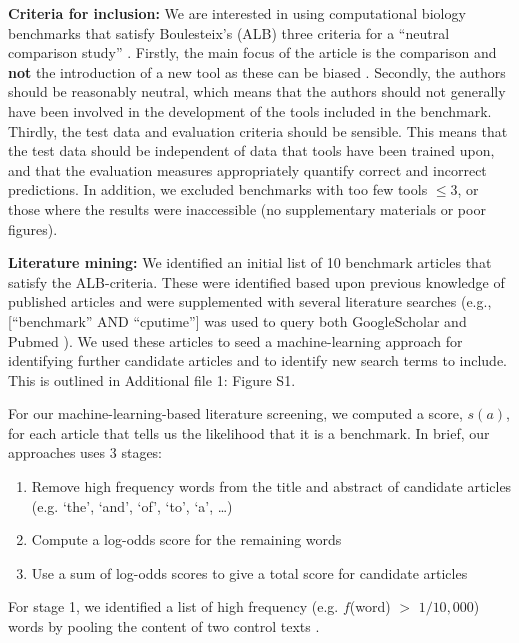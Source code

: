 \documentclass{bmcart}
\begin{document}
\textbf{Criteria for inclusion:} We are interested in using
computational biology benchmarks that satisfy Boulesteix’s (ALB) three
criteria for a ``neutral comparison study''
\cite{Boulesteix2013-vb}. Firstly, the main focus of the article is
the comparison and \textbf{not} the introduction of a new tool
{\color{black}as these can be biased} \cite{Buchka:2021a}. Secondly, the
authors should be reasonably neutral, which means that the authors
should not generally have been involved in the development of the
tools included in the benchmark. Thirdly, the test data and evaluation
criteria should be sensible. This means that the test data should be
independent of data that tools have been trained upon, and that the
evaluation measures appropriately quantify correct and incorrect
predictions. {\color{black} In addition, we excluded benchmarks with too
  few tools $\le 3$, or those where the results were inaccessible (no
  supplementary materials or poor figures).}

\textbf{Literature mining:} We identified an initial list of 10 benchmark
articles that satisfy the ALB-criteria. These were identified based
upon previous knowledge of published articles and were supplemented
with several literature searches (e.g., [``benchmark'' AND ``cputime''] was
used to query both GoogleScholar and Pubmed
\cite{Sayers2010-vm,McEntyre2001-fl}). We used these articles to seed
a machine-learning approach for identifying further candidate articles
and to identify new search terms to include. {\color{black}This is outlined in Additional file 1: Figure S1. }

For our machine-learning-based literature screening, we computed a
score, $s(a)$, for each article that tells us the likelihood that it
is a benchmark. In brief, our approaches uses 3 stages:
\begin{enumerate}
\item Remove high frequency words from the title and abstract of candidate articles (e.g. ‘the’, ‘and’, ‘of’, ‘to’, ‘a’, …) 
\item Compute a log-odds score for the remaining words 
\item Use a sum of log-odds scores to give a total score for candidate articles
\end{enumerate}
For stage 1, we identified a list of high frequency (e.g. $f$(word) $>$
$1/10,000$) words by pooling the content of two control texts
\cite{Carroll1865-hk,Tolkien1937-ke}.
\end{document}
